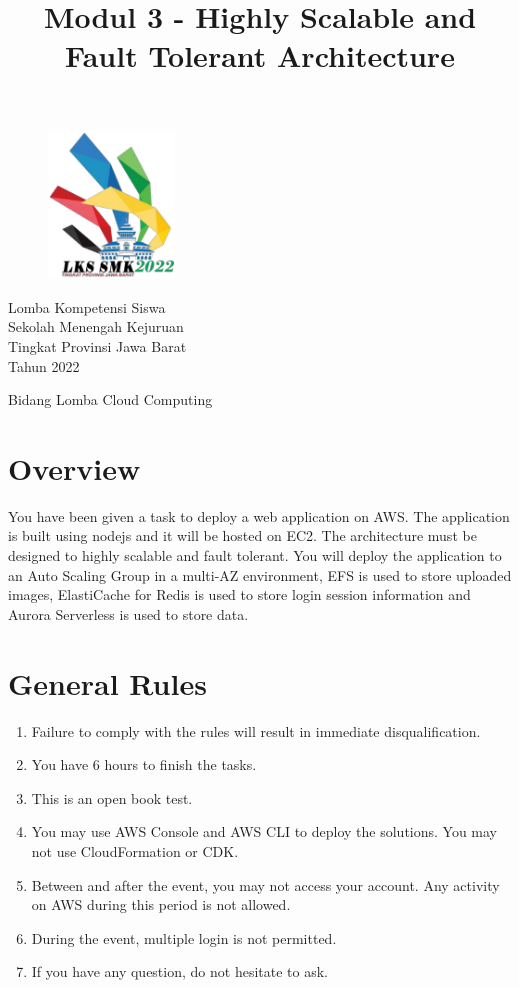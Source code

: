 \documentclass{article}
\title{Modul 3 - Highly Scalable and Fault Tolerant Architecture}
\author{}
\begin{document}
\begin{figure}[h]
\centering
\includegraphics[width=0.3\textwidth]{logo.png}
\end{figure}
\centering
{\huge
Lomba Kompetensi Siswa\\
Sekolah Menengah Kejuruan\\
Tingkat Provinsi Jawa Barat\\
Tahun 2022\\
\vspace{10mm} 
}
\vspace{30mm} 
{\let\newpage\relax\maketitle}
\vspace{30mm} 
{\LARGE Bidang Lomba Cloud Computing}

\thispagestyle{empty}
\newpage
\raggedright
{}

\section{Overview}
You have been given a task to deploy a web application on AWS. The application is built using nodejs and it will be hosted on EC2. The architecture must be designed to highly scalable and fault tolerant. You will deploy the application to an Auto Scaling Group in a multi-AZ environment, EFS is used to store uploaded images, ElastiCache for Redis is used to store login session information and Aurora Serverless is used to store data.

\section{General Rules}
\begin{enumerate}
    \item Failure to comply with the rules will result in immediate disqualification.
    \item You have 6 hours to finish the tasks.
    \item This is an open book test.
    \item You may use AWS Console and AWS CLI to deploy the solutions. You may not use CloudFormation or CDK.
    \item Between and after the event, you may not access your account. Any activity on AWS during this period is not allowed.
    \item During the event, multiple login is not permitted.
    \item If you have any question, do not hesitate to ask.
\end{enumerate}
\end{document}
